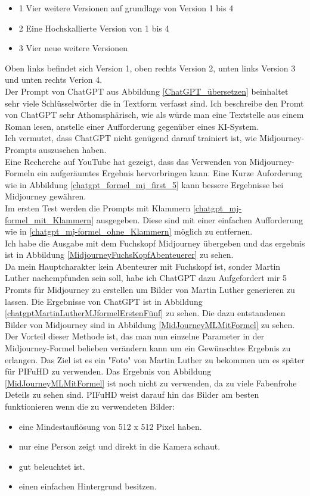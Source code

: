\begin{itemize}
	\item 1 Vier weitere Versionen auf grundlage von Version 1 bis 4
	\item 2 Eine Hochskallierte Version von 1 bis 4
	\item 3 Vier neue weitere Versionen
\end{itemize}
Oben links befindet sich Version 1, oben rechts Version 2, unten links Version 3 und unten rechts Verion 4.
\\
Der Prompt von ChatGPT aus Abbildung \ref{ChatGPT_übersetzen} beinhaltet sehr viele Schlüsselwörter die in Textform verfasst sind. Ich beschreibe den Promt von ChatGPT sehr Athomsphärisch, wie als würde man eine Textstelle aus einem Roman lesen, anstelle einer Aufforderung gegenüber eines KI-System.
\\
Ich vermutet, dass ChatGPT nicht genügend darauf trainiert ist, wie Midjourney-Prompts auszusehen haben.
\\
Eine Recherche auf YouTube hat gezeigt, dass das Verwenden von Midjourney-Formeln ein aufgeräumtes Ergebnis hervorbringen kann. Eine Kurze Auforderung wie in Abbildung \ref{chatgpt_formel_mj_first_5} kann bessere Ergebnisse bei Midjourney gewähren.
\\
Im ersten Test werden die Prompts mit Klammern \ref{chatgpt_mj-formel_mit_Klammern} ausgegeben. Diese sind mit einer einfachen Aufforderung wie in \ref{chatgpt_mj-formel_ohne_Klammern} möglich zu entfernen.
\\
Ich habe die Ausgabe mit dem Fuchskopf Midjourney übergeben und das ergebnis ist in Abbildung \ref{MidjourneyFuchsKopfAbenteuerer} zu sehen.
\\
Da mein Hauptcharakter kein Abenteurer mit Fuchskopf ist, sonder Martin Luther nachempfunden sein soll, habe ich ChatGPT dazu Aufgefordert mir 5 Promts für Midjourney zu erstellen um Bilder von Martin Luther generieren zu lassen. Die Ergebnisse von ChatGPT ist in Abbildung \ref{chatgptMartinLutherMJformelErstenFünf} zu sehen. Die dazu entstandenen Bilder von Midjourney sind in Abbildung \ref{MidJourneyMLMitFormel} zu sehen.
\\
Der Vorteil dieser Methode ist, das man nun einzelne Parameter in der Midjourney-Formel belieben verändern kann um ein Gewünschtes Ergebnis zu erlangen. Das Ziel ist es ein "Foto" von Martin Luther zu bekommen um es später für PIFuHD zu verwenden. Das Ergebnis von Abbildung \ref{MidJourneyMLMitFormel} ist noch nicht zu verwenden, da zu viele Fabenfrohe Deteils zu sehen sind. PIFuHD weist darauf hin das Bilder am besten funktionieren wenn die zu verwendeten Bilder:
\begin{itemize}
	\item eine Mindestauflösung von 512 x 512 Pixel haben.
	\item nur eine Person zeigt und direkt in die Kamera schaut.
	\item gut beleuchtet ist.
	\item einen einfachen Hintergrund besitzen.
\end{itemize}

